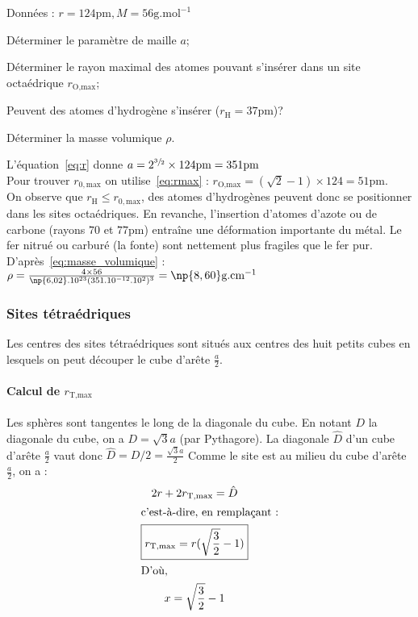 \begin{ex}
    Données : $r = 124\text{pm}, M = 56\text{g.mol}^{-1}$
    \begin{compactitem}
        \item Déterminer le paramètre de maille $a$;
        \item Déterminer le rayon maximal des atomes pouvant s'insérer dans un
            site octaédrique $r_{\text{O,max}}$;
        \item Peuvent des atomes d'hydrogène s'insérer ($r_{\text{H}} = 37$pm)?
        \item Déterminer la masse volumique $\rho$.
    \end{compactitem}
    L'équation~\ref{eq:r} donne
    $a=2^{\sfrac{3}{2}} \times 124\text{pm} = 351\text{pm}$\\
    Pour trouver $r_{0,\text{max}}$ on utilise~\ref{eq:rmax} :
    $r_{\text{O,max}} = (\sqrt{2} - 1)\times 124 = 51\text{pm}$.\\
    On observe que $r_{\text{H}} \leq r_{0,\text{max}}$, des atomes
    d'hydrogènes peuvent donc se positionner dans les sites
    octaédriques. En revanche, l'insertion d'atomes d'azote ou de
    carbone (rayons $70$ et $77$pm) entraîne une déformation importante
    du métal. Le fer nitrué ou carburé (la fonte) sont nettement
    plus fragiles que le fer pur.
    D'après~\ref{eq:masse_volumique} :
    $\rho = \frac{4 \times 56}{\np{6,02}.10^{23}(351.10^{-12}.10^2)^3} = \np{8,60}\text{g.cm}^{-1}$
\end{ex}

\subsubsection{Sites tétraédriques}
Les centres des sites tétraédriques sont situés aux centres des
huit petits cubes en lesquels on peut découper le cube d’arête
$\frac{a}{2}$.
\paragraph{Calcul de $r_{\text{T,max}}$}
Les sphères sont tangentes le long de la diagonale du cube.
En notant $D$ la diagonale du cube, on a $D = \sqrt{3}a$
(par Pythagore). La diagonale $\hat{D}$ d'un cube d'arête $\frac{a}{2}$
vaut donc $\hat{D} = D/2 = \frac{\sqrt{3}a}{2}$
Comme le site est au milieu du cube d'arête $\frac{a}{2}$, on a :
\begin{gather}
    2r + 2r_{\text{T,max}} = \hat{D}\\
    \intertext{c'est-à-dire, en remplaçant :}
    \boxed{r_{\text{T,max}} = r(\sqrt{\frac{3}{2}} - 1)}\label{eq:rmax_tetra}\\
    \intertext{D'où,}
    x = \sqrt{\frac{3}{2}} - 1
\end{gather}


